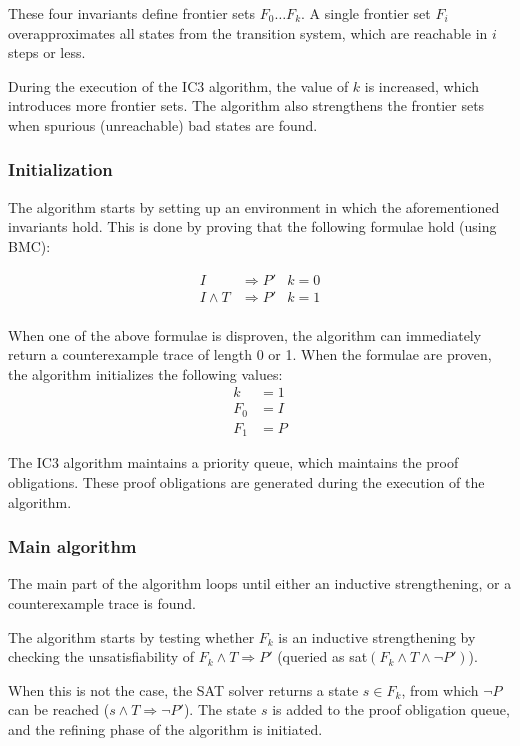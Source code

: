 \documentclass[a4paper]{article}
\begin{document}
These four invariants define frontier sets $F_0 \ldots F_k$. A single frontier set $F_i$ overapproximates all states from the transition system, which are reachable in $i$ steps or less.

During the execution of the IC3 algorithm, the value of $k$ is increased, which introduces more frontier sets. The algorithm also strengthens the frontier sets when spurious (unreachable) bad states are found.

\subsubsection{Initialization}
The algorithm starts by setting up an environment in which the aforementioned invariants hold. This is done by proving that the following formulae hold (using BMC):

\begin{align*}
I&\Rightarrow P' & k=0\\
I \land T &\Rightarrow P' & k=1\\
\end{align*}

When one of the above formulae is disproven, the algorithm can immediately return a counterexample trace of length 0 or 1. When the formulae are proven, the algorithm initializes the following values:
\begin{align*}
k &= 1\\
F_0 &= I\\
F_1 &= P
\end{align*}

The IC3 algorithm maintains a priority queue, which maintains the proof obligations. These proof obligations are generated during the execution of the algorithm.

\subsubsection{Main algorithm}
The main part of the algorithm loops until either an inductive strengthening, or a counterexample trace is found.

The algorithm starts by testing whether $F_k$ is an inductive strengthening by checking the unsatisfiability of $F_k \land T \Rightarrow P'$ (queried as sat$(F_k \land T \land \lnot P')$).

When this is not the case, the SAT solver returns a state $s \in F_k$, from which $\lnot P$ can be reached ($s \land T \Rightarrow \lnot P'$). The state $s$ is added to the proof obligation queue, and the refining phase of the algorithm is initiated.
\end{document}
